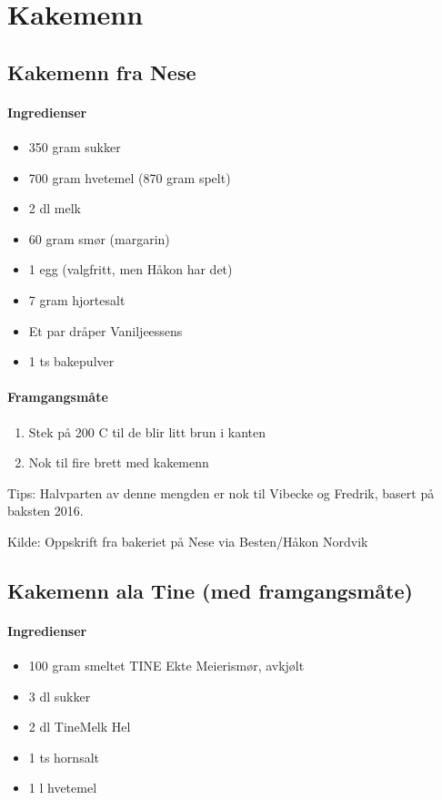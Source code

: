 \section{﻿Kakemenn}

\subsection{Kakemenn fra Nese}

\paragraph{Ingredienser}
\begin{itemize}[noitemsep]
	\item 350 gram sukker
	\item 700 gram hvetemel (870 gram spelt)
	\item 2 dl melk
	\item 60 gram smør (margarin)
	\item 1 egg (valgfritt, men Håkon har det)
	\item 7 gram hjortesalt
	\item Et par dråper Vaniljeessens
	\item 1 ts bakepulver
\end{itemize}

\paragraph{Framgangsmåte}
\begin{enumerate}[noitemsep]
	\item Stek på 200 \degree C til de blir litt brun i kanten
	\item Nok til fire brett med kakemenn
\end{enumerate}

Tips: Halvparten av denne mengden er nok til Vibecke og Fredrik, basert på baksten 2016.

Kilde: Oppskrift fra bakeriet på Nese via Besten/Håkon Nordvik


\subsection{Kakemenn ala Tine (med framgangsmåte)}

\paragraph{Ingredienser}
\begin{itemize}[noitemsep]
	\item 100 gram smeltet TINE Ekte Meierismør, avkjølt
	\item 3 dl sukker
	\item 2 dl TineMelk Hel
	\item 1 ts hornsalt
	\item 1 l hvetemel
\end{itemize}

